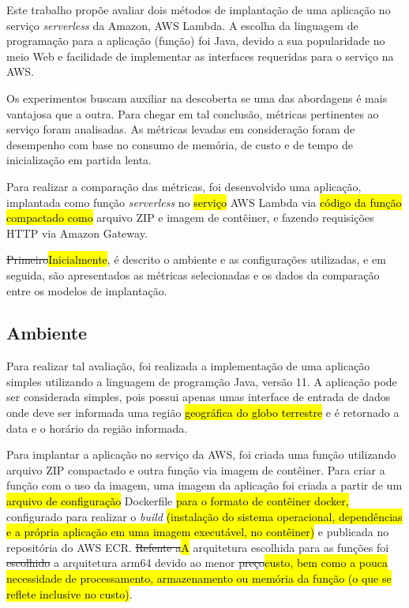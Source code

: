 \documentclass[10pt,conference]{IEEEtran}
\begin{document}
Este trabalho propõe avaliar dois métodos de implantação de uma aplicação no serviço \textit{serverless} da Amazon, AWS Lambda.
A escolha da linguagem de programação para a aplicação (função) foi Java, devido a sua popularidade no meio Web e facilidade de implementar as interfaces requeridas para o serviço na AWS.

Os experimentos buscam auxiliar na descoberta se uma das abordagens é mais vantajosa que a outra. Para chegar em tal conclusão, métricas pertinentes ao serviço foram analisadas. As métricas levadas em consideração foram de desempenho com base no consumo de memória, de custo e de tempo de inicialização em partida lenta. 

Para realizar a comparação das métricas, foi desenvolvido uma aplicação, implantada como função \textit{serverless} no \hl{serviço} AWS Lambda via \hl{código da função compactado como} arquivo ZIP e imagem de contêiner, e fazendo requisições HTTP via Amazon Gateway.

\st{Primeiro}\hl{Inicialmente}, é descrito o ambiente e as configurações utilizadas, e em seguida, são apresentados as métricas selecionadas e os dados da comparação entre os modelos de implantação.


\subsection{Ambiente}
\label{subsec:environment}

Para realizar tal avaliação, foi realizada a implementação de uma aplicação simples utilizando a linguagem de programção Java, versão 11. A aplicação pode ser considerada simples, pois possui apenas umas interface de entrada de dados onde deve ser informada uma região \hl{geográfica do globo terrestre} e é retornado a data e o horário da região informada. 

Para implantar a aplicação no serviço da AWS, foi criada uma função utilizando arquivo ZIP compactado e outra função via imagem de contêiner. Para criar a função com o uso da imagem, uma imagem da aplicação foi criada a partir de um \hl{arquivo de configuração} Dockerfile \hl{para o formato de contêiner docker,} configurado para realizar o \textit{build} \hl{(instalação do sistema operacional, dependências e a própria aplicação em uma imagem executável, no contêiner)} e publicada no repositória do AWS ECR. \st{Refente a}\hl{A} arquitetura escolhida para as funções foi \st{escolhido} a arquitetura arm64 devido ao menor \st{preço}\hl{custo, bem como a pouca necessidade de processamento, armazenamento ou memória da função (o que se reflete inclusive no custo)}.
\end{document}
